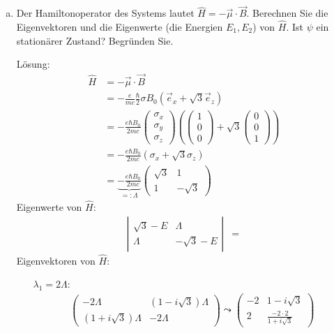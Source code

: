 \documentclass{scrartcl}
\begin{document}
\begin{enumerate}[a)]
\item Der Hamiltonoperator des Systems lautet $\hat H = - \vec \mu \cdot \vec B$. Berechnen Sie die Eigenvektoren und die Eigenwerte (die Energien $E_1, E_2$) von $\hat H$. Ist $\psi$ ein stationärer Zustand? Begründen Sie.
\item[Lösung:]
\begin{align*}
\hat H  &= -\vec \mu \cdot \vec B \\
	&= -\frac{e}{mc} \frac \hbar 2 \sigma B_0(\vec e_x +\sqrt 3 \vec e_z) \\
	&= -\frac{e\hbar B_0}{2mc}\begin{pmatrix}
	\sigma_x\\\sigma_y\\\sigma_z
	\end{pmatrix}
	\left(\begin{pmatrix}1\\0\\0\end{pmatrix} + \sqrt 3 \begin{pmatrix}0\\0\\1\end{pmatrix}\right) \\
 	&=  -\frac{e\hbar B_0}{2 mc}(\sigma_x + \sqrt 3 \sigma_z)\\
 	&= \underbrace{-\frac{e\hbar B_0}{2 mc}}_{=:\Lambda}\begin{pmatrix}
 	\sqrt 3 & 1 \\ 1 & -\sqrt 3
 	\end{pmatrix}
\end{align*}
Eigenwerte von $\hat H$:
\begin{align*}
\left|\begin{matrix}
\sqrt 3 -E & \Lambda  \\ \Lambda & -\sqrt 3-E
\end{matrix}\right| &= \
\end{align*}
Eigenvektoren von $\hat H$:
\begin{itemize}
\item [$\lambda_1 = 2\Lambda$:]
\begin{align*}
\begin{pmatrix}
-2\Lambda & (1-i\sqrt 3)\Lambda \\(1+i\sqrt 3)\Lambda & -2\Lambda
\end{pmatrix} \leadsto
\begin{pmatrix}
-2 & 1-i\sqrt 3 \\
2 & \frac{-2 \cdot 2}{1+i\sqrt 3}
\end{pmatrix} \\

\end{align*}
\end{itemize}
\end{enumerate}
\end{document}

